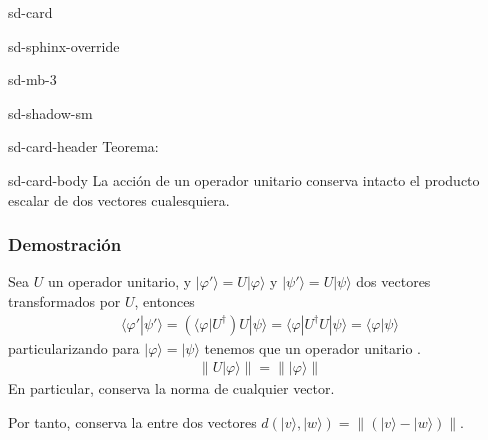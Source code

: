 \documentclass[letterpaper,10pt,english]{jupyterBook}
\newcommand{\bra}[1]{\langle #1|}
\newcommand{\ket}[1]{|#1\rangle}
\newcommand{\braket}[2]{\langle #1|#2\rangle}
\begin{document}
\begin{sphinxuseclass}{sd-card}
\begin{sphinxuseclass}{sd-sphinx-override}
\begin{sphinxuseclass}{sd-mb-3}
\begin{sphinxuseclass}{sd-shadow-sm}
\begin{sphinxuseclass}{sd-card-header}
\sphinxAtStartPar
Teorema:

\end{sphinxuseclass}
\begin{sphinxuseclass}{sd-card-body}
\sphinxAtStartPar
La acción de un operador unitario conserva intacto el producto escalar de dos vectores cualesquiera.

\end{sphinxuseclass}
\end{sphinxuseclass}
\end{sphinxuseclass}
\end{sphinxuseclass}
\end{sphinxuseclass}\subsubsection*{Demostración}

\sphinxAtStartPar
Sea \(U\) un operador unitario, y \(\ket{\varphi'}=U\ket{\varphi}\) y \(\ket{\psi'} = U\ket{\psi}\)
dos vectores transformados por \(U\), entonces
\begin{equation*}
\begin{split}
\braket{\varphi'}{\psi'} = \left(\bra{\varphi}U^\dagger\right)U\ket{\psi} = \bra{\varphi} U^\dagger U \ket{\psi} = 
\braket{\varphi}{\psi}
\end{split}
\end{equation*}
\sphinxAtStartPar
particularizando para \(\ket{\varphi} = \ket{\psi}\) tenemos que un operador unitario .
\begin{equation*}
\begin{split}
\|U \ket{\varphi}\| = \|\ket{\varphi}\|
\end{split}
\end{equation*}
\sphinxAtStartPar
En particular, conserva  la norma de cualquier vector.

\sphinxAtStartPar
Por tanto, conserva la  entre dos vectores \( d (\ket{v},\ket{w})= \| (\ket{v}-\ket{w}) \| \).
\end{document}
